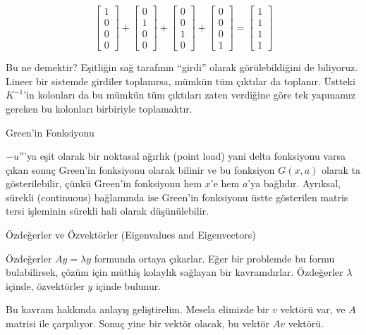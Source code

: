 \documentclass[12pt,fleqn]{article}\usepackage{../../common}
\begin{document}
$$ 
\left[\begin{array}{c} 1 \\ 0 \\ 0 \\ 0  \end{array} \right] +
\left[\begin{array}{c} 0 \\ 1 \\ 0 \\ 0  \end{array} \right] +
\left[\begin{array}{c} 0 \\ 0 \\ 1 \\ 0  \end{array} \right] +
\left[\begin{array}{c} 0 \\ 0 \\ 0 \\ 1  \end{array} \right] = 
\left[\begin{array}{c} 1 \\ 1 \\ 1 \\ 1  \end{array} \right] 
 $$

Bu ne demektir? Eşitliğin sağ tarafının ``girdi'' olarak görülebildiğini de
biliyoruz. Lineer bir sistemde girdiler toplanırsa, mümkün tüm çıktılar da
toplanır. Üstteki $K^{-1}$'in kolonları da bu mümkün tüm çıktıları zaten
verdiğine göre tek yapmamız gereken bu kolonları birbiriyle toplamaktır. 

Green'in Fonksiyonu

$-u''$'ya eşit olarak bir noktasal ağırlık (point load) yani delta
fonksiyonu varsa çıkan sonuç Green'in fonksiyonu olarak bilinir ve
bu fonksiyon $G(x,a)$ olarak ta gösterilebilir, çünkü Green'in fonksiyonu hem
$x$'e hem $a$'ya bağlıdır. Ayrıksal, sürekli (continuous) bağlamında ise
Green'in fonksiyonu üstte gösterilen matris tersi işleminin sürekli hali
olarak düşünülebilir. 

Özdeğerler ve Özvektörler (Eigenvalues and Eigenvectors)

Özdeğerler $Ay = \lambda y$ formunda ortaya çıkarlar. Eğer bir problemde bu
formu bulabilirsek, çözüm için müthiş kolaylık sağlayan bir
kavramdırlar. Özdeğerler $\lambda$ içinde, özvektörler $y$ içinde bulunur. 

Bu kavram hakkında anlayış geliştirelim. Mesela elimizde bir $v$ vektörü
var, ve $A$ matrisi ile çarpılıyor. Sonuç yine bir vektör olacak, bu vektör
$Av$ vektörü. 
\end{document}
